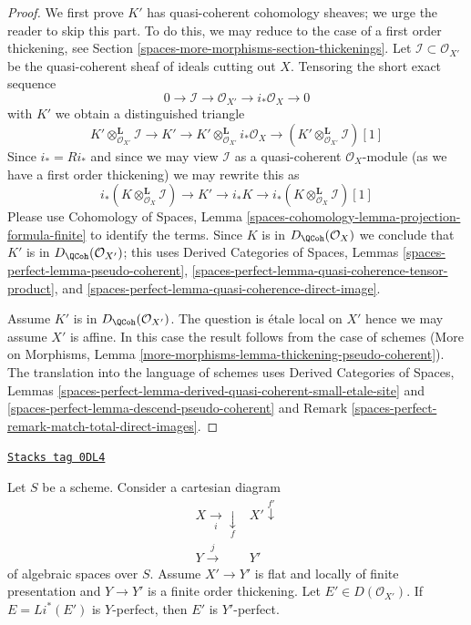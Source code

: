 \begin{proof}
We first prove $K'$ has quasi-coherent cohomology sheaves; we urge
the reader to skip this part.
To do this, we may reduce to the case of a first order thickening, see
Section \ref{spaces-more-morphisms-section-thickenings}. Let $\mathcal{I} \subset \mathcal{O}_{X'}$
be the quasi-coherent sheaf of ideals cutting out $X$.
Tensoring the short exact sequence
$$
0 \to \mathcal{I} \to \mathcal{O}_{X'} \to i_*\mathcal{O}_X \to 0
$$
with $K'$ we obtain a distinguished triangle
$$
K' \otimes_{\mathcal{O}_{X'}}^\mathbf{L} \mathcal{I}
\to K' \to
K' \otimes_{\mathcal{O}_{X'}}^\mathbf{L} i_*\mathcal{O}_X
\to
(K' \otimes_{\mathcal{O}_{X'}}^\mathbf{L} \mathcal{I})[1]
$$
Since $i_* = Ri_*$ and since we may view $\mathcal{I}$
as a quasi-coherent $\mathcal{O}_X$-module (as we have a first
order thickening) we may rewrite this as
$$
i_*(K \otimes_{\mathcal{O}_X}^\mathbf{L} \mathcal{I})
\to K' \to
i_*K \to
i_*(K \otimes_{\mathcal{O}_X}^\mathbf{L} \mathcal{I})[1]
$$
Please use Cohomology of Spaces, Lemma
\ref{spaces-cohomology-lemma-projection-formula-finite}
to identify the terms. Since $K$ is in
$D_\QCoh(\mathcal{O}_X)$ we conclude that
$K'$ is in $D_\QCoh(\mathcal{O}_{X'})$; this uses
Derived Categories of Spaces, Lemmas
\ref{spaces-perfect-lemma-pseudo-coherent},
\ref{spaces-perfect-lemma-quasi-coherence-tensor-product}, and
\ref{spaces-perfect-lemma-quasi-coherence-direct-image}.

\medskip\noindent
Assume $K'$ is in $D_\QCoh(\mathcal{O}_{X'})$.
The question is \'etale local on $X'$
hence we may assume $X'$ is affine.
In this case the result follows from the case of schemes
(More on Morphisms, Lemma
\ref{more-morphisms-lemma-thickening-pseudo-coherent}).
The translation into the language of schemes uses
Derived Categories of Spaces, Lemmas
\ref{spaces-perfect-lemma-derived-quasi-coherent-small-etale-site} and
\ref{spaces-perfect-lemma-descend-pseudo-coherent} and
Remark \ref{spaces-perfect-remark-match-total-direct-images}.
\end{proof}

\begin{lemma}
\label{spaces-more-morphisms-lemma-thickening-relatively-perfect}
\href{https://stacks.math.columbia.edu/tag/0DL4}{\texttt{Stacks tag 0DL4}}

Let $S$ be a scheme. Consider a cartesian diagram
$$
\begin{array}{cc}X \underset{i}{\longrightarrow}\underset{f}{\downarrow} & X' \overset{f'}{\downarrow} \\ Y \overset{j}{\longrightarrow} & Y'\end{array}
$$
of algebraic spaces over $S$. Assume $X' \to Y'$ is flat and locally
of finite presentation and $Y \to Y'$ is a finite order thickening.
Let $E' \in D(\mathcal{O}_{X'})$. If $E = Li^*(E')$ is $Y$-perfect,
then $E'$ is $Y'$-perfect.
\end{lemma}

